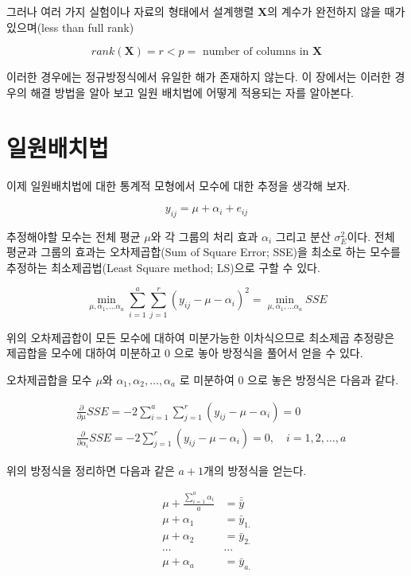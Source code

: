 \documentclass[
]{book}
\newcommand{\pardiff}[2]{\frac{\partial #1}{\partial #2 }}
\theoremstyle{definition}
\theoremstyle{definition}
\theoremstyle{definition}
\theoremstyle{definition}
\theoremstyle{remark}
\begin{document}
그러나 여러 가지 실험이나 자료의 형태에서 설계행렬 \(\bm X\)의 계수가 완전하지 않을 때가 있으며(less than full rank)

\[
rank(\bm X) =r < p= \text{ number of columns in } \bm X 
\]

이러한 경우에는 정규방정식에서 유일한 해가 존재하지 않는다. 이 장에서는 이러한 경우의 해결 방법을 알아 보고 일원 배치법에 어떻게 적용되는 자를 알아본다.

\hypertarget{uxc77cuxc6d0uxbc30uxce58uxbc95}{%
\section{일원배치법}\label{uxc77cuxc6d0uxbc30uxce58uxbc95}}

이제 일원배치법에 대한 통계적 모형에서 모수에 대한 추정을 생각해 보자.

\begin{equation}
y_{ij} = \mu + \alpha_i + e_{ij} 
\label{eq:oneway}
\end{equation}

추정해야할 모수는 전체 평균 \(\mu\)와 각 그룹의 처리 효과 \(\alpha_i\) 그리고 분산 \(\sigma_E^2\)이다. 전체 평균과 그룹의 효과는 오차제곱합(Sum of Square Error; SSE)을 최소로 하는 모수를 추정하는 최소제곱법(Least Square method; LS)으로 구할 수 있다.

\begin{equation} 
 \min_{\mu, \alpha_1, \dots \alpha_a} \sum_{i=1}^a \sum_{j=1}^r 
(y_{ij} - \mu -\alpha_i)^2 =\min_{\mu, \alpha_1, \dots \alpha_a} SSE 
\label{eq:lsesse}
\end{equation}

위의 오차제곱합이 모든 모수에 대하여 미분가능한 이차식으므로 최소제곱 추정량은 제곱합을 모수에 대하여 미분하고 0 으로 놓아 방정식을 풀어서 얻을 수 있다.

오차제곱합을 모수 \(\mu\)와 \(\alpha_1,\alpha_2,\dots,\alpha_a\) 로 미분하여 0 으로 놓은 방정식은 다음과 같다.

\begin{align*}
& \pardiff{}{\mu} SSE = -2 \sum_{i=1}^a \sum_{j=1}^r (y_{ij} - \mu -\alpha_i) = 0 \\
& \pardiff{}{\alpha_i} SSE = -2 \sum_{j=1}^r (y_{ij} - \mu -\alpha_i) = 0 , \quad i=1,2,\dots, a 
\end{align*}

위의 방정식을 정리하면 다음과 같은 \(a+1\)개의 방정식을 얻는다.

\begin{align}
   \mu +\frac{ \sum_{i=1}^a \alpha_i}{a} & = \bar {\bar y}\\
   \mu + \alpha_1  & =  \bar {y}_{1.} \\
   \mu + \alpha_2  & =  \bar {y}_{2.} \\
         \cdots & \cdots \\
   \mu + \alpha_a  & =  \bar {y}_{a.} \\
\label{eq:normaleq1}   
\end{align}
\end{document}
